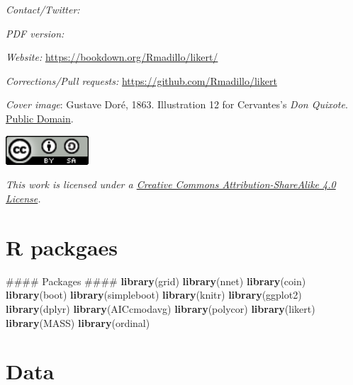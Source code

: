 \documentclass[]{book}
\newenvironment{Shaded}{\begin{snugshade}}{\end{snugshade}}
\newcommand{\KeywordTok}[1]{\textcolor[rgb]{0.13,0.29,0.53}{\textbf{{#1}}}}
\newcommand{\NormalTok}[1]{{#1}}
\begin{document}
\emph{Contact/Twitter:} \citet{healthstatsdude}

\emph{PDF version:}

\emph{Website:} \url{https://bookdown.org/Rmadillo/likert/}

\emph{Corrections/Pull requests:}
\url{https://github.com/Rmadillo/likert}

\emph{Cover image}: Gustave Doré, 1863. Illustration 12 for Cervantes's
\emph{Don Quixote}.
\href{https://commons.wikimedia.org/w/index.php?curid=677913}{Public
Domain}.

\includegraphics[width=1.22in]{images/cc-by-sa}

\emph{This work is licensed under a
\href{https://creativecommons.org/licenses/by-sa/4.0/}{Creative Commons
Attribution-ShareAlike 4.0 License}.}

\section*{R packgaes}\label{r-packgaes}

\begin{Shaded}
\begin{Highlighting}[]
\NormalTok{#### Packages ####}
\KeywordTok{library}\NormalTok{(grid)}
\KeywordTok{library}\NormalTok{(nnet)}
\KeywordTok{library}\NormalTok{(coin)}
\KeywordTok{library}\NormalTok{(boot)}
\KeywordTok{library}\NormalTok{(simpleboot)}
\KeywordTok{library}\NormalTok{(knitr)}
\KeywordTok{library}\NormalTok{(ggplot2)}
\KeywordTok{library}\NormalTok{(dplyr)}
\KeywordTok{library}\NormalTok{(AICcmodavg)}
\KeywordTok{library}\NormalTok{(polycor)}
\KeywordTok{library}\NormalTok{(likert)}
\KeywordTok{library}\NormalTok{(MASS)}
\KeywordTok{library}\NormalTok{(ordinal)}
\end{Highlighting}
\end{Shaded}

\section*{Data}\label{data}
\end{document}
